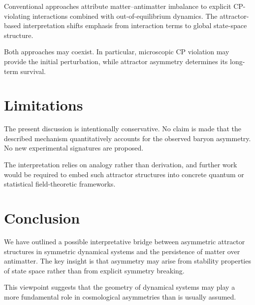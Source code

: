 \documentclass[11pt]{article}
\begin{document}
Conventional approaches attribute matter--antimatter imbalance to explicit
CP-violating interactions combined with out-of-equilibrium dynamics. The
attractor-based interpretation shifts emphasis from interaction terms to global
state-space structure.

Both approaches may coexist. In particular, microscopic CP violation may provide
the initial perturbation, while attractor asymmetry determines its long-term
survival.

\section{Limitations}

The present discussion is intentionally conservative. No claim is made that the
described mechanism quantitatively accounts for the observed baryon asymmetry.
No new experimental signatures are proposed.

The interpretation relies on analogy rather than derivation, and further work
would be required to embed such attractor structures into concrete quantum or
statistical field-theoretic frameworks.

\section{Conclusion}

We have outlined a possible interpretative bridge between asymmetric attractor
structures in symmetric dynamical systems and the persistence of matter over
antimatter. The key insight is that asymmetry may arise from stability properties
of state space rather than from explicit symmetry breaking.

This viewpoint suggests that the geometry of dynamical systems may play a more
fundamental role in cosmological asymmetries than is usually assumed.
\end{document}
